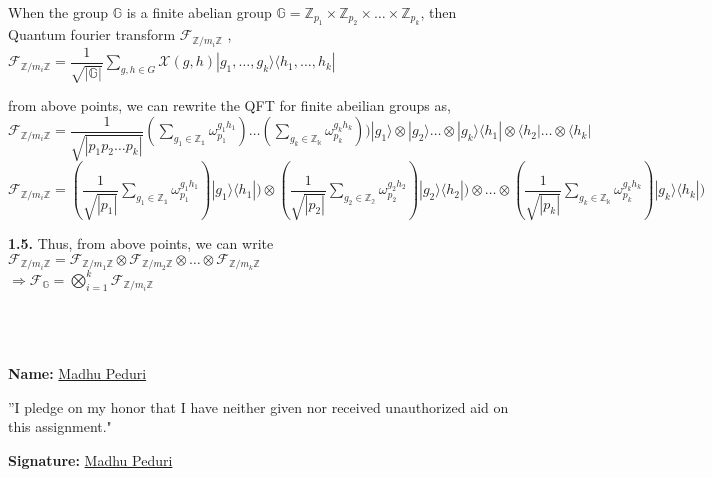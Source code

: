\documentclass [12pt]{article}
\theoremstyle{definition}
\newcommand{\ket}[1]{| {#1} \rangle}
\newcommand{\bra}[1]{\langle {#1} |}
\newcommand{\tensor}[2]{ #1 \otimes  #2 }
\newcommand{\md}[1]{|#1|}
\newcommand{\suml}[2]{\sum\limits_{#1}^{#2}}
\newcommand{\im}[1]{\mathds{#1}/m_{i}\mathds{#1}}
\begin{document}
\phantom{1000em} When the group $\mathds{G}$ is a finite abelian group $\mathds{G} = \mathds{Z}_{p_{1}} \times \mathds{Z}_{p_{2}} \times \dots \times \mathds{Z}_{p_{k}}$, then\\
\phantom{1000em} Quantum fourier transform $\mathcal{F}_{\im{Z}}$ ,\\
\phantom{1000em} $\mathcal{F}_{\im{Z}} = \dfrac{1}{\sqrt{\md{\mathds{G}}}}\suml{g,h \in G}{}\mathcal{X}(g,h) \ket{g_{1}, \dots , g_{k}}\bra{h_{1}, \dots , h_{k}}$

\phantom{1000em} from above points, we can rewrite the QFT for finite abeilian groups as,\\
\phantom{1000em} $\mathcal{F}_{\im{Z}} =  \dfrac{1}{\sqrt{\md{p_{1}p_{2} \dots p_{k}}}} (\suml{g_{1} \in \mathds{Z_{1}}}{} \omega_{p_{1}}^{g_{1}h_{1}}) \dots (\suml{g_{k} \in \mathds{Z_{k}}}{} \omega_{p_{k}}^{g_{k}h_{k}})) \tensor{\ket{g_{1}}}{\ket{g_{2}}} \dots \otimes \ket{g_{k}}\tensor{\bra{h_{1}}}{\bra{h_{2}}} \dots \otimes \bra{h_{k}}$\\
\phantom{1000em} $\mathcal{F}_{\im{Z}} =(\dfrac{1}{\sqrt{\md{p_{1}}}}\suml{g_{1} \in \mathds{Z_{1}}}{} \omega_{p_{1}}^{g_{1}h_{1}})\ket{g_{1}}\bra{h_{1}}) \otimes (\dfrac{1}{\sqrt{\md{p_{2}}}}\suml{g_{2} \in \mathds{Z_{2}}}{} \omega_{p_{2}}^{g_{2}h_{2}})\ket{g_{2}}\bra{h_{2}}) \otimes \dots \otimes (\dfrac{1}{\sqrt{\md{p_{k}}}}\suml{g_{k} \in \mathds{Z_{k}}}{} \omega_{p_{k}}^{g_{k}h_{k}})\ket{g_{k}}\bra{h_{k}})$

\phantom{1em} {\bf 1.5.} Thus, from above points, we can write \\ 
\phantom{1000em} $\mathcal{F}_{\im{Z}} = \mathcal{F}_{\mathds{Z}/m_{1}\mathds{Z}} \otimes \mathcal{F}_{\mathds{Z}/m_{2}\mathds{Z}} \otimes \dots \otimes \mathcal{F}_{\mathds{Z}/m_{k}\mathds{Z}}$\\
\phantom{1000em} $\Rightarrow \mathcal{F}_{\mathds{G}} = \bigotimes\limits_{i=1}^{k}\mathcal{F}_{\im{Z}}$

\quad \\ \quad \\ \quad \\

\textbf{Name:} \underline{Madhu Peduri}

''I pledge on my honor that I have neither given nor received unauthorized aid on this assignment."

\textbf{Signature:} \underline{Madhu Peduri}
\end{document}

